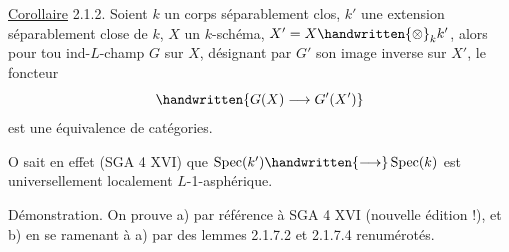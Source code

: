 \reversemarginpar
{}
\normalmarginpar
\uline{Corollaire} 2.1.2. Soient $k$ un corps séparablement clos, $k'$ une extension séparablement close de $k$, $X$ un $k$-schéma, $X'=X\handwritten{\otimes}_k k'$, alors pour tou  ind-\uline{$L$}-champ $G$ sur $X$, désignant par $G'$ son image inverse sur $X'$, le foncteur
\[
\handwritten{G(X)\longrightarrow G'(X')}
\]
est une équivalence de catégories.

O sait en effet (SGA 4 XVI\quad\quad) que $\operatorname{Spec}(k')\handwritten{\longrightarrow}\operatorname{Spec}(k)$ est universellement localement \uline{$L$}-1-asphérique.

Démonstration. On prouve a) par référence à SGA 4 XVI (nouvelle édition !), et b) en se ramenant à a) par des lemmes 2.1.7.2 et 2.1.7.4 renumérotés.
\begin{flushright}\begin{minipage}{.68\linewidth}
\end{minipage}\end{flushright}
